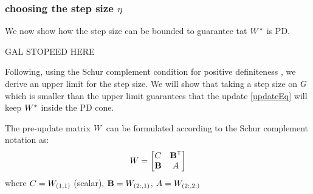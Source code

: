 \documentclass{article}
\begin{document}
\subsubsection{choosing the step size $\eta$}
We now show how the step size can be bounded to guarantee tat ${{W^*}}$ is PD.

GAL STOPEED HERE

Following, using the Schur complement condition for positive
definiteness , we derive an upper limit for the step
size. We will show that taking a step size on ${G}$ which is
smaller than the upper limit guarantees that the update
\eqref{updateEq} will keep ${{W^*}}$ inside the PD cone.

The pre-update matrix ${W}$ can be formulated according to the Schur complement notation as: 
\begin{equation}
{W}= \left[ \begin{matrix} C & \mathbf{B{}^\mathsf{T}} \\ \mathbf{B} & {A} \end{matrix} \right]
\label{schurNotationPreUpdate}
\end{equation}
where $C = {W}_{(1,1)}$ (scalar), $\mathbf{B} = {W}_{(2:,1)}$, ${A} = {W}_{(2:,2:)}$
\end{document}
